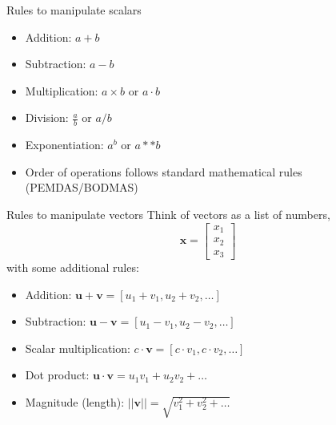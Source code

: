 \documentclass{beamer}
\begin{document}
\begin{frame}{Rules to manipulate scalars}
    \begin{itemize}
        \item Addition: $a + b$
        \item Subtraction: $a - b$
        \item Multiplication: $a \times b$ or $a \cdot b$
        \item Division: $\frac{a}{b}$ or $a / b$
        \item Exponentiation: $a^b$ or $a**b$
        \item Order of operations follows standard mathematical rules (PEMDAS/BODMAS)
    \end{itemize}
\end{frame}
\begin{frame}{Rules to manipulate vectors}
    Think of vectors as a list of numbers,
        $$\mathbf{x} = \begin{bmatrix}
    x_1 \\
    x_2 \\
    x_3
    \end{bmatrix}$$ 
    with some additional rules:
    \begin{itemize}
        \item Addition: $\mathbf{u} + \mathbf{v} = [u_1 + v_1, u_2 + v_2, \ldots]$
        \item Subtraction: $\mathbf{u} - \mathbf{v} = [u_1 - v_1, u_2 - v_2, \ldots]$
        \item Scalar multiplication: $c \cdot \mathbf{v} = [c \cdot v_1, c \cdot v_2, \ldots]$
        \item Dot product: $\mathbf{u} \cdot \mathbf{v} = u_1 v_1 + u_2 v_2 + \ldots$
        \item Magnitude (length): $||\mathbf{v}|| = \sqrt{v_1^2 + v_2^2 + \ldots}$
    \end{itemize}
\end{frame}
\end{document}
